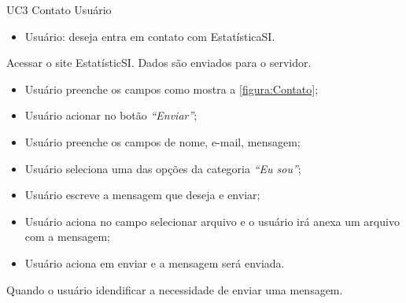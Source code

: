 \casoDeUso
{UC3}
{Contato}
{Usuário}
{
\begin{itemize}
	\item Usuário: deseja entra em contato com EstatísticaSI.	
\end{itemize}

}
{Acessar o site EstatísticSI.}
{Dados são enviados para o servidor.}
{
\begin{itemize}
	\item Usuário preenche os campos como mostra a \ref{figura:Contato}; 
	\item Usuário acionar no botão \textit{“Enviar”};	

\end{itemize}
}
{
\begin{itemize}
	\item Usuário preenche os campos de nome, e-mail, mensagem;
	\item Usuário seleciona uma das opções da categoria \textit{“Eu sou”};
	\item Usuário escreve a mensagem que deseja e enviar;
	\item Usuário aciona no campo selecionar arquivo e o usuário irá anexa um arquivo com a mensagem;
	\item Usuário aciona em enviar e a mensagem será enviada.
	
\end{itemize}
}
{Quando o usuário idendificar a necessidade de enviar uma mensagem.}
{

}


